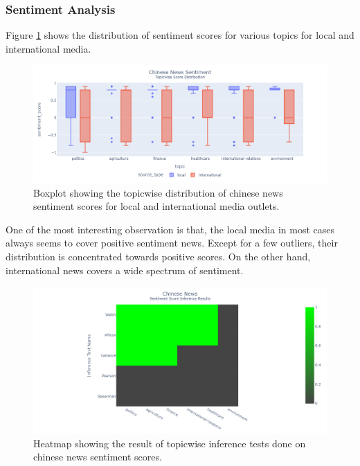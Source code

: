 \documentclass{article}
\theoremstyle{mytheoremstyle}
\theoremstyle{mytheoremstyle}
\theoremstyle{myproblemstyle}
\begin{document}
    \subsubsection{Sentiment Analysis}

    Figure \ref{fig:china_sentiment_score_boxplot} shows the distribution of sentiment scores for various topics for local and international media. 
    
    \begin{figure}[hp]
        \centering
        \includegraphics[width=\linewidth]{../images/plots/China/china_boxplot_sentiment.png}
        \caption{Boxplot showing the topicwise distribution of chinese news sentiment scores for local and international media outlets.}
        \label{fig:china_sentiment_score_boxplot}
    \end{figure}  

    One of the most interesting observation is that, the local media in most cases always seems to cover positive sentiment news. Except for a few outliers, their distribution is concentrated towards positive scores. On the other hand, international news covers a wide spectrum of sentiment. 

    \begin{figure}[hp]
        \centering
        \includegraphics[width=\linewidth]{../images/plots/China/china_heatmap_inference_sentiment.png}
        \caption{Heatmap showing the result of topicwise inference tests done on chinese news sentiment scores.}
        \label{fig:china_sentiment_score_heatmap}
    \end{figure}
\end{document}
